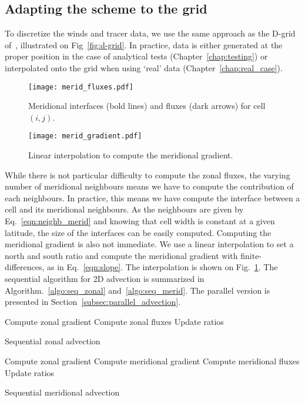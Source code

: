 \subsection{Adapting the scheme to the grid}
To discretize the winds and tracer data, we use the same approach as the D-grid
of~\cite{Arakawa1977}, illustrated on Fig~\ref{fig:d-grid}. In practice, data is
either generated at the proper position in the case of analytical tests
(Chapter~\ref{chap:testing}) or interpolated onto the grid when using `real' data
(Chapter~\ref{chap:real_case}).
\begin{figure}
  \begin{minipage}[t]{0.48\linewidth} 
    \centering
    \texttt{[image: merid\_fluxes.pdf]}
    \caption{Meridional interfaces (bold lines) and fluxes (dark arrows) for
    cell $(i,j)$.}
\label{fig:merid_fluxes}
  \end{minipage}
  \hfill
  \begin{minipage}[t]{0.48\linewidth} 
    \centering
    \texttt{[image: merid\_gradient.pdf]}
    \caption{Linear interpolation to compute the meridional gradient.}
\label{fig:merid_interpol}
  \end{minipage}
\end{figure}

While there is not particular difficulty to compute the zonal fluxes, the varying
number of meridional neighbours means we have to compute the contribution of
each neighbours. In practice, this means we have compute the interface between a
cell and its meridional neighbours. As the neighbours are given by
Eq.~\eqref{eqn:neighb_merid} and knowing that cell width is constant at a given
latitude, the size of the interfaces can be easily computed.
Computing the meridional gradient is also not immediate. We use a linear
interpolation to set a north and south ratio and compute the meridional gradient
with finite-differences, as in Eq.~\eqref{eqn:slope}. The interpolation is shown on
Fig.~\ref{fig:merid_interpol}.
The sequential algorithm for 2D advection is summarized in
Algorithm.~\ref{algo:seq_zonal} and~\ref{algo:seq_merid}. The parallel version is
presented in Section~\ref{subsec:parallel_advection}.
\begin{algorithm}
  \begin{algorithmic}[1]
    \State Compute zonal gradient 
    \State Compute zonal fluxes 
    \State Update ratios
  \end{algorithmic}
  \caption{Sequential zonal advection}
\label{algo:seq_zonal}
\end{algorithm}
\begin{algorithm}
  \begin{algorithmic}[1]
    \State Compute zonal gradient 
    \State Compute meridional gradient 
    \State Compute meridional fluxes 
    \State Update ratios
  \end{algorithmic}
  \caption{Sequential meridional advection}
\label{algo:seq_merid}
\end{algorithm}


